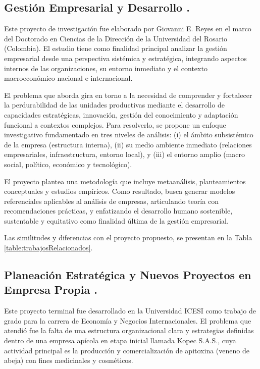\subsection{Gestión Empresarial y Desarrollo \cite{Reyes12}.}

Este proyecto de investigación fue elaborado por Giovanni E. Reyes en el marco del Doctorado en Ciencias de la Dirección de la Universidad del Rosario (Colombia). El estudio tiene como finalidad principal analizar la gestión empresarial desde una perspectiva sistémica y estratégica, integrando aspectos internos de las organizaciones, su entorno inmediato y el contexto macroeconómico nacional e internacional.

El problema que aborda gira en torno a la necesidad de comprender y fortalecer la perdurabilidad de las unidades productivas mediante el desarrollo de capacidades estratégicas, innovación, gestión del conocimiento y adaptación funcional a contextos complejos. Para resolverlo, se propone un enfoque investigativo fundamentado en tres niveles de análisis: (i) el ámbito subsistémico de la empresa (estructura interna), (ii) su medio ambiente inmediato (relaciones empresariales, infraestructura, entorno local), y (iii) el entorno amplio (macro social, político, económico y tecnológico).

El proyecto plantea una metodología que incluye metaanálisis, planteamientos conceptuales y estudios empíricos. Como resultado, busca generar modelos referenciales aplicables al análisis de empresas, articulando teoría con recomendaciones prácticas, y enfatizando el desarrollo humano sostenible, sustentable y equitativo como finalidad última de la gestión empresarial.

Las similitudes y diferencias con el proyecto propuesto, se presentan en la Tabla \ref{table:trabajosRelacionados}.

\subsection{Planeación Estratégica y Nuevos Proyectos en Empresa Propia \cite{Patino19}.}
Este proyecto terminal fue desarrollado en la Universidad ICESI como trabajo de grado para la carrera de Economía y Negocios Internacionales. El problema que atendió fue la falta de una estructura organizacional clara y estrategias definidas dentro de una empresa apícola en etapa inicial llamada Kopec S.A.S., cuya actividad principal es la producción y comercialización de apitoxina (veneno de abeja) con fines medicinales y cosméticos.

